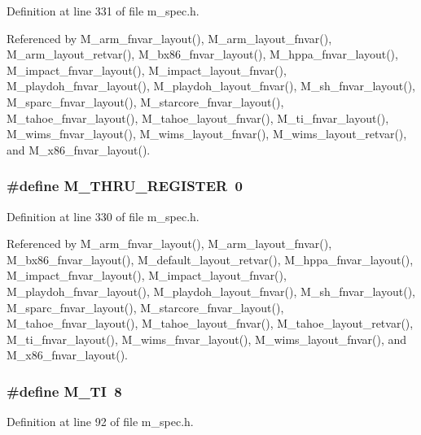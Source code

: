 Definition at line 331 of file m\_\-spec.h.

Referenced by M\_\-arm\_\-fnvar\_\-layout(), M\_\-arm\_\-layout\_\-fnvar(), M\_\-arm\_\-layout\_\-retvar(), M\_\-bx86\_\-fnvar\_\-layout(), M\_\-hppa\_\-fnvar\_\-layout(), M\_\-impact\_\-fnvar\_\-layout(), M\_\-impact\_\-layout\_\-fnvar(), M\_\-playdoh\_\-fnvar\_\-layout(), M\_\-playdoh\_\-layout\_\-fnvar(), M\_\-sh\_\-fnvar\_\-layout(), M\_\-sparc\_\-fnvar\_\-layout(), M\_\-starcore\_\-fnvar\_\-layout(), M\_\-tahoe\_\-fnvar\_\-layout(), M\_\-tahoe\_\-layout\_\-fnvar(), M\_\-ti\_\-fnvar\_\-layout(), M\_\-wims\_\-fnvar\_\-layout(), M\_\-wims\_\-layout\_\-fnvar(), M\_\-wims\_\-layout\_\-retvar(), and M\_\-x86\_\-fnvar\_\-layout().
\subsubsection{\setlength{\rightskip}{0pt plus 5cm}\#define M\_\-THRU\_\-REGISTER~0}\label{m__spec_8h_bdefb92a2baf80a2b431fe5eb5095b80}




Definition at line 330 of file m\_\-spec.h.

Referenced by M\_\-arm\_\-fnvar\_\-layout(), M\_\-arm\_\-layout\_\-fnvar(), M\_\-bx86\_\-fnvar\_\-layout(), M\_\-default\_\-layout\_\-retvar(), M\_\-hppa\_\-fnvar\_\-layout(), M\_\-impact\_\-fnvar\_\-layout(), M\_\-impact\_\-layout\_\-fnvar(), M\_\-playdoh\_\-fnvar\_\-layout(), M\_\-playdoh\_\-layout\_\-fnvar(), M\_\-sh\_\-fnvar\_\-layout(), M\_\-sparc\_\-fnvar\_\-layout(), M\_\-starcore\_\-fnvar\_\-layout(), M\_\-tahoe\_\-fnvar\_\-layout(), M\_\-tahoe\_\-layout\_\-fnvar(), M\_\-tahoe\_\-layout\_\-retvar(), M\_\-ti\_\-fnvar\_\-layout(), M\_\-wims\_\-fnvar\_\-layout(), M\_\-wims\_\-layout\_\-fnvar(), and M\_\-x86\_\-fnvar\_\-layout().
\subsubsection{\setlength{\rightskip}{0pt plus 5cm}\#define M\_\-TI~8}\label{m__spec_8h_a759317922ba0d7ffe0d28c0f46bbd0f}




Definition at line 92 of file m\_\-spec.h.

